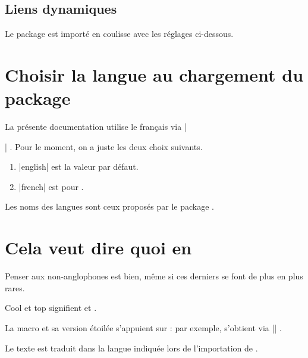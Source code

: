 \subsection{Liens dynamiques}

Le package  est importé en coulisse avec les réglages ci-dessous.


\begin{tdoclatex}[code]
\hypersetup{
  colorlinks,
  citecolor = orange!75!black,
  filecolor = orange!75!black,
  linkcolor = orange!75!black,
  urlcolor  = orange!75!black
}
\end{tdoclatex}


\section{Choisir la langue au chargement du package}

La présente documentation utilise le français via \tdocinlatex|\usepackage[lang = french]{tutodoc}| .
Pour le moment, on a juste les deux choix suivants.

\begin{enumerate}
    \item \tdocinlatex|english| est la valeur par défaut.

    \item \tdocinlatex|french| est pour .
\end{enumerate}


\begin{tdocnote}
    Les noms des langues sont ceux proposés par le package .
\end{tdocnote}


\section{Cela veut dire quoi en }

Penser aux non-anglophones est bien, même si ces derniers se font de plus en plus rares.


\begin{tdoclatex}
Cool et top signifient  et .
\end{tdoclatex}


La macro  et sa version étoilée s'appuient sur  : par exemple,  s'obtient via \tdocinlatex|| .


\begin{tdocnote}
    Le texte  est traduit dans la langue indiquée lors de l'importation de \thispack{}.
\end{tdocnote}


